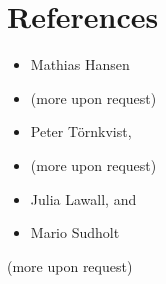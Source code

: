 \documentclass[11pt,a4paper,sans]{moderncv}
\begin{document}
\section{References}
\begin{cvcolumns}
      {\begin{itemize}
      \item Mathias Hansen 
      \item(more upon request)
      \end{itemize}}
    {\begin{itemize}
        \item Peter Törnkvist, 
        \item(more upon request)
        \end{itemize}}
    
    {\begin{itemize}
            \item Julia Lawall, and
            \item   Mario Sudholt
    \end{itemize}(more upon request)}
\end{cvcolumns}
\footnotesize
\end{document}
